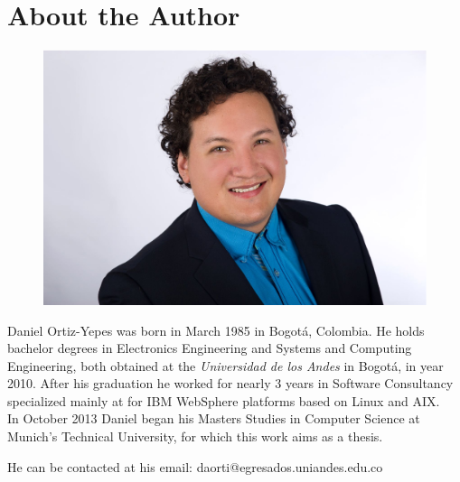 \chapter{About the Author}
\thispagestyle{empty}


\begin{figure}[ht]
\hspace{75mm}
		\includegraphics[width=.4\textwidth]{figures/dortiz-portrait.eps}
		\label{fig:me}
\end{figure}

\vspace{15mm}

Daniel Ortiz-Yepes was born in March 1985 in Bogot\'a, Colombia. He holds bachelor degrees in Electronics Engineering and Systems and Computing Engineering, both obtained at the \textit{Universidad de los Andes} in Bogot\'a,  in year 2010. After his graduation he worked for nearly 3 years in Software Consultancy specialized mainly at for IBM WebSphere platforms based on Linux and AIX.
\\
 In October 2013 Daniel began his Masters Studies in Computer Science at Munich's Technical University, for which this work aims as a thesis. 

\vspace{20mm}
\begin{flushright}
He can be contacted at his email: daorti@egresados.uniandes.edu.co
\end{flushright}


\vspace{1cm}
